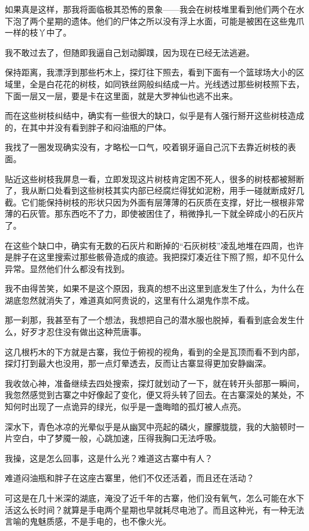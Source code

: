 如果真是这样，那我将面临极其恐怖的景象——我会在树枝堆里看到他们两个在水下泡了两个星期的遗体。他们的尸体之所以没有浮上水面，可能是被困在这些鬼爪一样的枝丫中了。

我不敢过去了，但随即我逼自己划动脚蹼，因为现在已经无法逃避。

保持距离，我漂浮到那些朽木上，探灯往下照去，看到下面有一个篮球场大小的区域里，全是白花花的树枝，如同铁丝网般纠结成一片。光线透过那些树枝照下去，下面一层又一层，要是卡在这里面，就是大罗神仙也逃不出来。

而在这些树枝纠结中，确实有一些很大的缺口，似乎是有人强行掰开这些树枝造成的，在其中并没有看到胖子和闷油瓶的尸体。

我找了一圈发现确实没有，才略松一口气，咬着钢牙逼自己沉下去靠近树枝的表面。

贴近这些树枝我屏息一看，立即发现这片树枝肯定困不死人，很多的树枝都被掰断了，我从断口处看到这些树枝其实内部已经腐烂得犹如泥粉，用手一碰就断成好几截。它们能保持树枝的形状只因为外面有层薄薄的石灰质在支撑，好比一根根非常薄的石灰管。那东西吃不了力，即使被困住了，稍微挣扎一下就全碎成小的石灰片了。

在这些个缺口中，确实有无数的石灰片和断掉的“石灰树枝”凌乱地堆在四周，也许是胖子在这里搜索过那些骸骨造成的痕迹。我把探灯凑近往下照了照，却不见什么异常。显然他们什么都没有找到。

我不由得苦笑，如果不是这个原因，我真的想不出这里到底发生了什么，为什么在湖底忽然就消失了，难道真如阿贵说的，这里有什么湖鬼作祟不成。

那一刹那，我甚至有了一个想法，我想把自己的潜水服也脱掉，看看到底会发生什么，好歹才忍住没有做出这种荒唐事。

这几根朽木的下方就是古寨，我位于俯视的视角，看到的全是瓦顶而看不到内部，探灯打到最大也没用，那一点灯晕透去，反而让古寨显得更加安静幽深。

我收敛心神，准备继续去四处搜索，探灯就划动了一下，就在转开头部那一瞬间，我忽然感觉到古寨之中好像起了变化，便又将头转了回去。在古寨深处的某处，不知何时出现了一点诡异的绿光，似乎是一盏晦暗的孤灯被人点亮。

深水下，青色冰凉的光晕似乎是从幽冥中亮起的磷火，朦朦胧胧，我的大脑顿时一片空白，中了梦魇一般，心跳加速，压得我胸口无法呼吸。

我操，这是怎么回事，这是什么光？难道这古寨中有人？

难道闷油瓶和胖子在这座古寨里，他们不仅还活着，而且还在活动？

可这是在几十米深的湖底，淹没了近千年的古寨，他们没有氧气，怎么可能在水下活这么长时间？就算是手电两个星期也早就耗尽电池了。而且这种光，有一种无法言喻的鬼魅质感，不是手电的，也不像火光。

